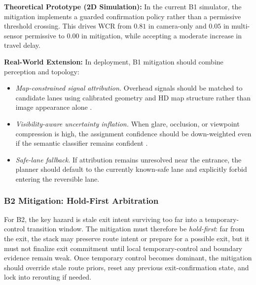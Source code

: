 \documentclass[sigconf,nonacm]{acmart}
\begin{document}
\textbf{Theoretical Prototype (2D Simulation):} In the current B1 simulator, the mitigation implements a guarded confirmation policy rather than a permissive threshold crossing. This drives WCR from $0.81$ in camera-only and $0.05$ in multi-sensor permissive to $0.00$ in mitigation, while accepting a moderate increase in travel delay.

\textbf{Real-World Extension:} In deployment, B1 mitigation should combine perception and topology:
\begin{itemize}
    \item \textit{Map-constrained signal attribution.} Overhead signals should be matched to candidate lanes using calibrated geometry and HD map structure rather than image appearance alone \cite{hirabayashi2019}.
    \item \textit{Visibility-aware uncertainty inflation.} When glare, occlusion, or viewpoint compression is high, the assignment confidence should be down-weighted even if the semantic classifier remains confident \cite{behrendt2017,jensen2018}.
    \item \textit{Safe-lane fallback.} If attribution remains unresolved near the entrance, the planner should default to the currently known-safe lane and explicitly forbid entering the reversible lane.
\end{itemize}

\subsubsection{B2 Mitigation: Hold-First Arbitration}

For B2, the key hazard is stale exit intent surviving too far into a temporary-control transition window. The mitigation must therefore be \emph{hold-first}: far from the exit, the stack may preserve route intent or prepare for a possible exit, but it must not finalize exit commitment until local temporary-control and boundary evidence remain weak. Once temporary control becomes dominant, the mitigation should override stale route priors, reset any previous exit-confirmation state, and lock into rerouting if needed.
\end{document}
